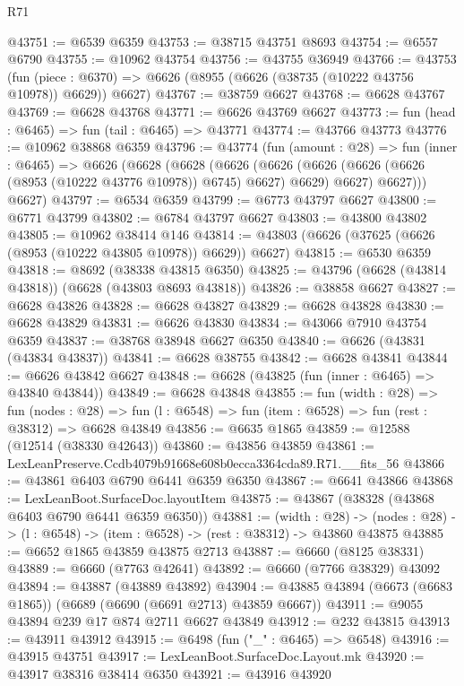 \begin{lexlean}{R71}
\begin{coremodule}
@43751 := @6539 @6359
@43753 := @38715 @43751 @8693
@43754 := @6557 @6790
@43755 := @10962 @43754
@43756 := @43755 @36949
@43766 := @43753
    (fun (piece : @6370) => @6626 (@8955 (@6626 (@38735 (@10222 @43756 @10978)) @6629)) @6627)
@43767 := @38759 @6627
@43768 := @6628 @43767
@43769 := @6628 @43768
@43771 := @6626 @43769 @6627
@43773 := fun (head : @6465) => fun (tail : @6465) => @43771
@43774 := @43766 @43773
@43776 := @10962 @38868 @6359
@43796 := @43774
    (fun (amount : @28) =>
    fun (inner : @6465) =>
    @6626
      (@6628
        (@6628
          (@6626
            (@6626 (@6626 (@6626 (@6626 (@8953 (@10222 @43776 @10978)) @6745) @6627) @6629) @6627)
            @6627)))
      @6627)
@43797 := @6534 @6359
@43799 := @6773 @43797 @6627
@43800 := @6771 @43799
@43802 := @6784 @43797 @6627
@43803 := @43800 @43802
@43805 := @10962 @38414 @146
@43814 := @43803 (@6626 (@37625 (@6626 (@8953 (@10222 @43805 @10978)) @6629)) @6627)
@43815 := @6530 @6359
@43818 := @8692 (@38338 @43815 @6350)
@43825 := @43796 (@6628 (@43814 @43818)) (@6628 (@43803 @8693 @43818))
@43826 := @38858 @6627
@43827 := @6628 @43826
@43828 := @6628 @43827
@43829 := @6628 @43828
@43830 := @6628 @43829
@43831 := @6626 @43830
@43834 := @43066 @7910 @43754 @6359
@43837 := @38768 @38948 @6627 @6350
@43840 := @6626 (@43831 (@43834 @43837))
@43841 := @6628 @38755
@43842 := @6628 @43841
@43844 := @6626 @43842 @6627
@43848 := @6628 (@43825 (fun (inner : @6465) => @43840 @43844))
@43849 := @6628 @43848
@43855 := fun (width : @28) =>
  fun (nodes : @28) => fun (l : @6548) => fun (item : @6528) => fun (rest : @38312) => @6628 @43849
@43856 := @6635 @1865
@43859 := @12588 (@12514 (@38330 @42643))
@43860 := @43856 @43859
@43861 := LexLeanPreserve.Ccdb4079b91668e608b0ecca3364cda89.R71.__fits_56
@43866 := @43861 @6403 @6790 @6441 @6359 @6350
@43867 := @6641 @43866
@43868 := LexLeanBoot.SurfaceDoc.layoutItem
@43875 := @43867 (@38328 (@43868 @6403 @6790 @6441 @6359 @6350))
@43881 := (width : @28) ->
  (nodes : @28) -> (l : @6548) -> (item : @6528) -> (rest : @38312) -> @43860 @43875
@43885 := @6652 @1865 @43859 @43875 @2713
@43887 := @6660 (@8125 @38331)
@43889 := @6660 (@7763 @42641)
@43892 := @6660 (@7766 @38329) @43092
@43894 := @43887 (@43889 @43892)
@43904 := @43885 @43894 (@6673 (@6683 @1865)) (@6689 (@6690 (@6691 @2713) @43859 @6667))
@43911 := @9055 @43894 @239 @17 @874 @2711 @6627 @43849
@43912 := @232 @43815
@43913 := @43911 @43912
@43915 := @6498 (fun ("_" : @6465) => @6548)
@43916 := @43915 @43751
@43917 := LexLeanBoot.SurfaceDoc.Layout.mk
@43920 := @43917 @38316 @38414 @6350
@43921 := @43916 @43920

\end{coremodule}
\end{lexlean}
